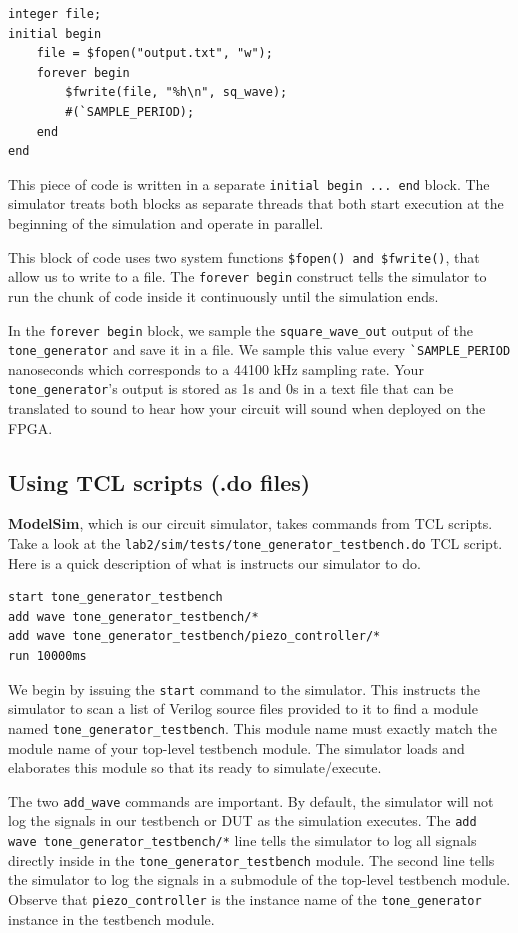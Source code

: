 \documentclass[11pt]{article}
\begin{document}
\begin{verbatim}
integer file;
initial begin
	file = $fopen("output.txt", "w");
	forever begin
		$fwrite(file, "%h\n", sq_wave);
		#(`SAMPLE_PERIOD);
	end
end
\end{verbatim}

This piece of code is written in a separate \verb|initial begin ... end| block. The simulator treats both blocks as separate threads that both start execution at the beginning of the simulation and operate in parallel.

This block of code uses two system functions \verb|$fopen() and $fwrite()|, that allow us to write to a file. The \verb|forever begin| construct tells the simulator to run the chunk of code inside it continuously until the simulation ends.

In the \verb|forever begin| block, we sample the \verb|square_wave_out| output of the \verb|tone_generator| and save it in a file. We sample this value every \verb|`SAMPLE_PERIOD| nanoseconds which corresponds to a 44100 kHz sampling rate. Your \verb|tone_generator|'s output is stored as 1s and 0s in a text file that can be translated to sound to hear how your circuit will sound when deployed on the FPGA.

\subsection{Using TCL scripts (.do files)}

\textbf{ModelSim}, which is our circuit simulator, takes commands from TCL scripts. Take a look at the \verb|lab2/sim/tests/tone_generator_testbench.do| TCL script. Here is a quick description of what is instructs our simulator to do.

\begin{verbatim}
start tone_generator_testbench
add wave tone_generator_testbench/*
add wave tone_generator_testbench/piezo_controller/*
run 10000ms
\end{verbatim}

We begin by issuing the \verb|start| command to the simulator. This instructs the simulator to scan a list of Verilog source files provided to it to find a module named \verb|tone_generator_testbench|. This module name must exactly match the module name of your top-level testbench module. The simulator loads and elaborates this module so that its ready to simulate/execute.

The two \verb|add_wave| commands are important. By default, the simulator will not log the signals in our testbench or DUT as the simulation executes. The \verb|add wave tone_generator_testbench/*| line tells the simulator to log all signals directly inside in the \verb|tone_generator_testbench| module. The second line tells the simulator to log the signals in a submodule of the top-level testbench module. Observe that \verb|piezo_controller| is the instance name of the \verb|tone_generator| instance in the testbench module.
\end{document}
